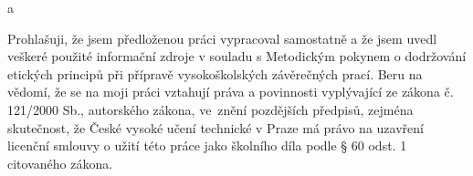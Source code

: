 \documentclass[czech,master,unicode]{ctufit-thesis}
\theoremstyle{plain}
\theoremstyle{definition}
\theoremstyle{remark}
\numberwithin{theorem}{chapter}
\begin{document}
 
\frontmatter\frontmatterinit %


\thispagestyle{empty}\cleardoublepage\maketitle %

\imprintpage %

\tableofcontents %
\listoffigures %
\begingroup
\let\clearpage\relax
\listoftables %
\listoflistings %
\endgroup

\begin{acknowledgmentpage}a
\end{acknowledgmentpage} 


\begin{declarationpage}
Prohlašuji, že jsem předloženou práci vypracoval samostatně a že jsem uvedl veškeré
použité informační zdroje v souladu s Metodickým pokynem o dodržování etických
principů při přípravě vysokoškolských závěrečných prací.
Beru na vědomí, že se na moji práci vztahují práva a povinnosti vyplývající ze zákona
č. 121/2000 Sb., autorského zákona, ve~znění pozdějších předpisů, zejména
skutečnost, že České vysoké učení technické v Praze má právo na uzavření licenční
smlouvy o užití této práce jako školního díla podle § 60 odst. 1 citovaného zákona.
\end{declarationpage}
\end{document}
